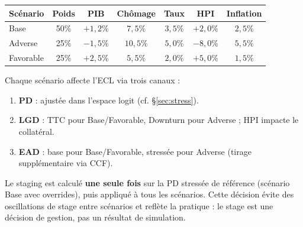 \documentclass[12pt,a4paper]{article}
\begin{document}
\begin{center}
\begin{tabular}{lcccccc}
\toprule
\textbf{Sc\'enario} & \textbf{Poids} & \textbf{PIB} & \textbf{Ch\^omage} & \textbf{Taux} & \textbf{HPI} & \textbf{Inflation} \\
\midrule
Base       & 50\% & $+1{,}2\%$ & $7{,}5\%$ & $3{,}5\%$ & $+2{,}0\%$ & $2{,}5\%$ \\
Adverse    & 25\% & $-1{,}5\%$ & $10{,}5\%$ & $5{,}0\%$ & $-8{,}0\%$ & $5{,}5\%$ \\
Favorable  & 25\% & $+2{,}5\%$ & $5{,}5\%$ & $2{,}0\%$ & $+5{,}0\%$ & $1{,}5\%$ \\
\bottomrule
\end{tabular}
\end{center}

Chaque sc\'enario affecte l'ECL via trois canaux :
\begin{enumerate}
    \item \textbf{PD} : ajust\'ee dans l'espace logit (cf. \S\ref{sec:stress}).
    \item \textbf{LGD} : TTC pour Base/Favorable, Downturn pour Adverse ; HPI impacte le collat\'eral.
    \item \textbf{EAD} : base pour Base/Favorable, stress\'ee pour Adverse (tirage suppl\'ementaire via CCF).
\end{enumerate}

\begin{warningbox}
Le staging est calcul\'e \textbf{une seule fois} sur la PD stress\'ee de r\'ef\'erence (sc\'enario Base avec overrides), puis appliqu\'e \`a tous les sc\'enarios. Cette d\'ecision \'evite des oscillations de stage entre sc\'enarios et refl\`ete la pratique : le stage est une d\'ecision de gestion, pas un r\'esultat de simulation.
\end{warningbox}
\end{document}
